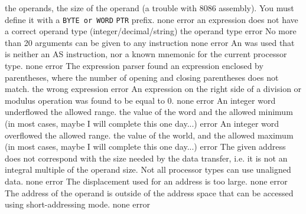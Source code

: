 \documentclass[12pt,twoside]{report}
\newcommand{\tty}[1]{{\tt #1}}
\begin{document}
\begin{description}
{                the operands, the size of the operand (a trouble with
                8086 assembly). You must define it with a \tty{BYTE or WORD}
                \tty{PTR} prefix.}
               {none}
               {error}
               {an expression does not have a correct operand type
                (integer/\-decimal/\-string)}
               {the operand type}
               {error}
               {No more than 20 arguments can be given to any instruction}
               {none}
               {error}
               {An  was used that is neither an AS instruction, nor a
                known mnemonic for the current processor type.}
               {none}
               {error}
               {The expression parser found an expression enclosed by
                parentheses, where the number of opening and closing
                parentheses does not match.}
               {the wrong expression}
               {error}
               {An expression on the right side of a division or modulus
                operation was found to be equal to 0.}
               {none}
               {error}
               {An integer word underflowed the allowed range.}
               {the value of the word and the allowed minimum (in most
                cases, maybe I will complete this one day...)}
               {error}
               {An integer word overflowed the allowed range.}
               {the value of the world, and the allowed maximum (in most
                cases, maybe I will complete this one day...)}
               {error}
               {The given address does not correspond with the size needed
                by the data transfer, i.e. it is not an integral multiple of
                the operand size. Not all processor types can use unaligned
                data.}
               {none}
               {error}
               {The displacement used for an address is too large.}
               {none}
               {error}
               {The address of the operand is outside of the address space
                that can be accessed using short-addressing mode.}
               {none}
               {error}

\end{description}
\end{document}
